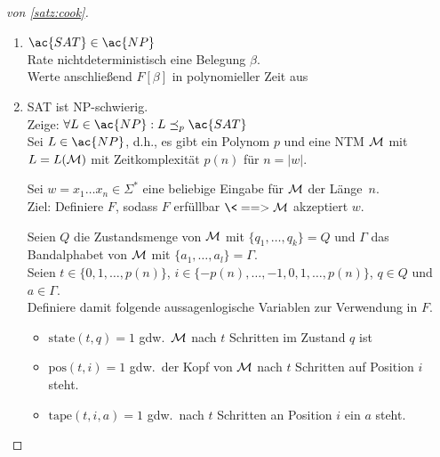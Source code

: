 \begin{proof}[von \autoref{satz:cook}]\
	\begin{enumerate}
	\item $\ac{SAT} \in \ac{NP}$\\
		Rate nichtdeterministisch eine Belegung $\beta$.\\
		Werte anschließend $F[\beta]$ in polynomieller Zeit aus
	\item \ac{SAT} ist \ac{NP}-schwierig.\\
		Zeige: $\forall L\in \ac{NP}: L \preceq_p \ac{SAT}$\\
		Sei $L\in \ac{NP}$, d.h., es gibt ein Polynom $p$ und eine \ac{NTM} $\mathcal{M}$ mit $L=L(\mathcal{M})$ mit Zeitkomplexität $p(n)$ für $n = |w|$.
		
		Sei $w = x_1\dots x_n\in\Sigma^*$ eine beliebige Eingabe für $\mathcal{M}$ der Länge~$n$.\\
		Ziel: Definiere $F$, sodass $F$ erfüllbar $\<==> \M$ akzeptiert $w$.
		
		Seien $Q$ die Zustandsmenge von $\mathcal{M}$ mit $\{q_1,\dots,q_k\}=Q$ und $\Gamma$ das Bandalphabet von $\mathcal{M}$ mit $\{a_1,\dots,a_l\} = \Gamma$.\\
		Seien $t\in\{0,1,\dots,p(n)\}$, $i\in\{-p(n),\dots,-1,0,1,\dots,p(n)\}$, $q \in Q$ und $a\in\Gamma$. \\
		Definiere damit folgende aussagenlogische Variablen zur Verwendung in $F$.
		\begin{itemize}
		\item $\mathrm{state}(t,q) = 1$ gdw.\ $\mathcal{M}$ nach $t$ Schritten im Zustand $q$ ist
		\item $\mathrm{pos}(t,i) = 1$ gdw.\ der Kopf von $\mathcal{M}$ nach $t$ Schritten auf Position $i$ steht.
		\item $\mathrm{tape}(t,i,a) = 1$ gdw.\ nach $t$ Schritten an Position $i$ ein $a$ steht.
		\end{itemize}
	\end{enumerate}

	\medskip


\end{proof}
